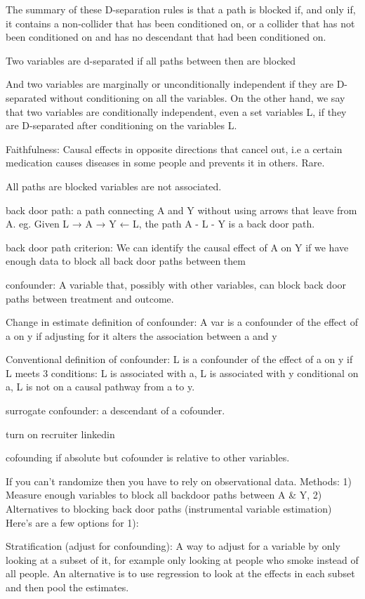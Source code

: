 \documentclass[]{book}
\begin{document}
The summary of these D-separation rules is that a path is blocked if, and only if, it
contains a non-collider that has been conditioned on, or a collider that has not been conditioned on
and has no descendant that had been conditioned on.

Two variables are d-separated if all paths between then are blocked

And two variables are marginally or unconditionally independent if they are D-separated without conditioning
on all the variables. On the other hand, we say that two variables are conditionally independent, even a set variables L, if they are D-separated after conditioning on the variables L.

Faithfulness: Causal effects in opposite directions that cancel out, i.e a certain medication causes diseases in some
people and prevents it in others. Rare.

All paths are blocked variables are not associated.

back door path: a path connecting A and Y without using arrows that leave from A. eg. Given L → A → Y ← L, the path A - L - Y is a back door path.

back door path criterion: We can identify the causal effect of A on Y if we have enough data to block all back door paths between them

confounder: A variable that, possibly with other variables, can block back door paths between treatment and outcome.

Change in estimate definition of confounder: A var is a confounder of the effect of a on y if adjusting for it alters the association between a and y

Conventional definition of confounder: L is a confounder of the effect of a on y if L meets 3 conditions: L is associated with a, L is associated with y conditional on a, L is not on a causal pathway from a to y.

surrogate confounder: a descendant of a cofounder.

turn on recruiter linkedin

cofounding if absolute but cofounder is relative to other variables.

If you can't randomize then you have to rely on observational data. Methods: 1) Measure enough variables to block all backdoor paths between A \& Y, 2) Alternatives to blocking back door paths (instrumental variable estimation) Here's are a few options for 1):

Stratification (adjust for confounding): A way to adjust for a variable by only looking at a subset of it, for example only looking at people who smoke instead of all people. An alternative is to use regression to look at the effects in each subset and then pool the estimates.
\end{document}
